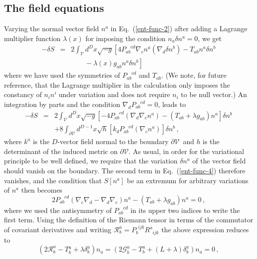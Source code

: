 \documentclass[12pt]{iopart}
\def\eq#1{{Eq.~(\ref{#1})}}
\newcommand{\Cal}[1]{\ensuremath{\mathcal{#1}}}
\newcommand{\ph}[1]{\phantom{#1}}
\newcommand{\D}{\ensuremath{\nabla}}
\newcommand{\dV}{\ensuremath{\partial\Cal{V}}}
\begin{document}
\subsection{The field equations}
 
Varying the normal vector field $ n^a$  in \eq{ent-func-2} after adding a
Lagrange multiplier function $\lambda(x)$ for imposing the   condition
$ n_a\delta  n^a=0$, we get 
\begin{eqnarray}
-\delta S &=& 2\int_\Cal{V} d^Dx\sqrt{-g}
  \left[4P_{ab}^{\ph{a}\ph{b}cd}\D_c n^a\left(\D_d\delta n^b\right)
  - T_{ab} n^a\delta n^b\right. \nonumber\\
   &&\left. \qquad  - \lambda(x) g_{ab} n^a\delta n^b\right]
 \label{ent-func-3}
\end{eqnarray}
where we have used the symmetries of $P_{ab}^{\ph{a}\ph{b}cd}$ and
$T_{ab}$.  (We note, for future reference, that the Lagrange multiplier in the calculation only imposes the constancy of $n_in^i$ under variation and  does not require  $n_i$ to be null vector.) An integration by parts and the
condition $\D_dP_{ab}^{\ph{a}\ph{b}cd}=0$, leads to 
\begin{eqnarray}
-\delta
S&=& 2\int_\Cal{V}{d^Dx\sqrt{-g}\left[-4P_{ab}^{\ph{a}\ph{b}cd}
  \left(\D_d\D_c n^a\right) - ( T_{ab}+ \lambda g_{ab}) n^a\right]\delta n^b}\nonumber\\
  &&+8\int_{\dV}{d^{D-1}x\sqrt{h}\left[k_d
  P_{ab}^{\ph{a}\ph{b}cd}\left(\D_c n^a\right)\right]\delta n^b}
\,,
\label{ent-func-4}
\end{eqnarray}
where $k^a$ is the $D$-vector field normal to the boundary \dV\ and
$h$ is the determinant of the induced metric on \dV.  As usual, in order for
the variational principle to be well defined, we require that the
variation $\delta n^a$ of the  vector field should vanish on the
boundary. The second term in \eq{ent-func-4} therefore vanishes, and
the condition that $S[ n^a]$ be an extremum for arbitrary variations of
$ n^a$ then becomes  
\begin{equation}
2P_{ab}^{\ph{a}\ph{b}cd}\left(\D_c\D_d-\D_d\D_c\right) n^a
-( T_{ab}+\lambda g_{ab}) n^a = 0\,,
\label{ent-func-5}
\end{equation}
where we used the antisymmetry of $P_{ab}^{\ph{a}\ph{b}cd}$ in its
upper two indices to write the first term. Using the definition of the
Riemann tensor in terms of the commutator of covariant derivatives and writing
$\mathcal{R}^a_b=P_b^{\ph{b}ijk}R^a_{\ph{a}ijk}$ 
the above expression reduces to
\begin{equation}
\left(2\mathcal{R}^a_b -  T{}^a_b+\lambda \delta^a_b\right) n_a
=\left( 2 \mathcal{G}^a_b - T^a_b + (L+\lambda) \delta^a_b\right) n_a
=0\,, 
\label{ent-func-6}
\end{equation}
\end{document}

